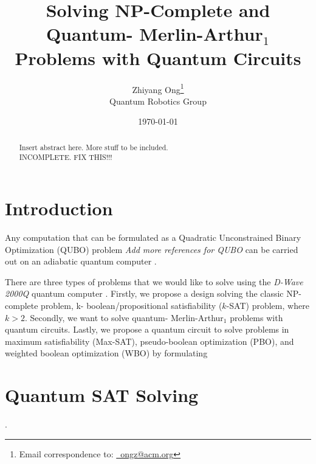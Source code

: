 \documentclass[letter,12pt]{article}
\begin{document}
\title{Solving NP-Complete and Quantum- Merlin-Arthur$_{1}$ Problems with Quantum Circuits}
\date{\today}
\author{Zhiyang Ong\thanks{Email correspondence to: \href{mailto:ongz@acm.org}{\Email\ ongz@acm.org}}\\
	Quantum Robotics Group
}
\maketitle


\begin{abstract} 
Insert abstract here. More stuff to be included. \\

{\Huge INCOMPLETE. FIX THIS!!!}
\end{abstract}




\section{Introduction}
\label{sec:Introduction}

Any computation that can be formulated as a Quadratic Unconstrained Binary Optimization (QUBO) problem \cite{Anjos2012} {\it \Huge Add more references for QUBO} can be carried out on an adiabatic quantum computer \cite{Tandon2017}.

There are three types of problems that we would like to solve using the {\it D-Wave 2000Q} quantum computer \cite{UniversitiesSpaceResearchAssociationStaff2015a}. Firstly, we propose a design solving the classic NP-complete problem, k- boolean/propositional satisfiability ($k$-SAT) problem, where $k > 2$. Secondly, we want to solve quantum- Merlin-Arthur$_{1}$ problems with quantum circuits. Lastly, we propose a quantum circuit to solve problems in maximum satisfiability (Max-SAT), pseudo-boolean optimization (PBO), and weighted boolean optimization (WBO) by formulating 


\section{Quantum SAT Solving }
\label{sec:mysection1}

 \cite{Anjos2012}.
\end{document}

